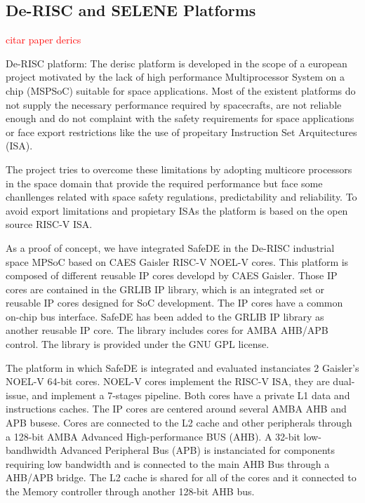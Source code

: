 \subsection{De-RISC and SELENE Platforms}

\textcolor{red}{citar paper derics}

De-RISC platform: The derisc platform is developed in the scope of a european project motivated by the lack of high performance Multiprocessor System on a chip (MSPSoC) suitable for space applications. Most of the existent platforms do not supply the necessary performance required by spacecrafts, are not reliable enough and do not complaint with the safety requirements for space applications or face export restrictions like the use of propeitary Instruction Set Arquitectures (ISA). 

The project tries to overcome these limitations by adopting multicore processors in the space domain that provide the required performance but face some chanllenges related with space safety regulations, predictability and reliability. To avoid export limitations and propietary ISAs the platform is based on the open source RISC-V ISA. 

As a proof of concept, we have integrated SafeDE in the De-RISC industrial space MPSoC based on CAES Gaisler RISC-V NOEL-V cores. This platform is composed of different reusable IP cores developd by CAES Gaisler. Those IP cores are contained in the GRLIB IP library, which is an integrated set or reusable IP cores designed for SoC development. The IP cores have a common on-chip bus interface. SafeDE has been added to the GRLIB IP library as another reusable IP core. The library includes cores for AMBA AHB/APB control. The library is provided under the GNU GPL license.

The platform in which SafeDE is integrated and evaluated instanciates 2 Gaisler's NOEL-V 64-bit cores. NOEL-V cores implement the RISC-V ISA, they are dual-issue, and implement a 7-stages pipeline. Both cores have a private L1 data and instructions caches. The IP cores are centered around several AMBA AHB and APB busese. Cores are connected to the L2 cache and other peripherals through a 128-bit AMBA Advanced High-performance BUS (AHB). A 32-bit low-bandhwidth Advanced Peripheral Bus (APB) is instanciated for components requiring low bandwidth and is connected to the main AHB Bus through a AHB/APB bridge. The L2 cache is shared for all of the cores and it connected to the Memory controller through another 128-bit AHB bus.



